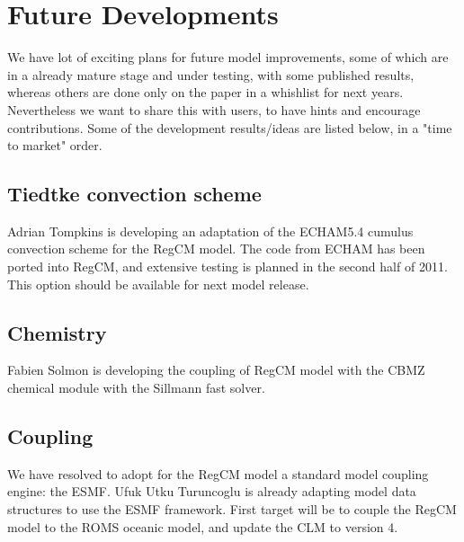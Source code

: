 
\chapter{Future Developments}

We have lot of exciting plans for future model improvements, some of which
are in a already mature stage and under testing, with some published results,
whereas others are done only on the paper in a whishlist for next years.
Nevertheless we want to share this with users, to have hints and encourage
contributions.
Some of the development results/ideas are listed below, in a "time to market"
order.

\section{Tiedtke convection scheme}

Adrian Tompkins is developing an adaptation of the ECHAM5.4 \cite{Tiedtke_89}
cumulus convection scheme for the \ac{RegCM} model. The code from ECHAM has
been ported into RegCM, and extensive testing is planned in the second half of
2011. This option should be available for next model release.

\section{Chemistry}

Fabien Solmon is developing the coupling of \ac{RegCM} model with the CBMZ
chemical module with the Sillmann fast solver.

\section{Coupling}

We have resolved to adopt for the \ac{RegCM} model a standard model coupling
engine: the \ac{ESMF}. Ufuk Utku Turuncoglu is already adapting model data
structures to use the \ac{ESMF} framework. First target will be to couple
the \ac{RegCM} model to the \ac{ROMS} oceanic model, and update the \ac{CLM}
to version 4.

